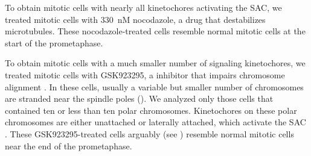To obtain mitotic cells with nearly all kinetochores activating the SAC, we treated mitotic cells with \SI{330}{nM} nocodazole, a drug that destabilizes microtubules. These nocodazole-treated cells resemble normal mitotic cells at the start of the prometaphase.

To obtain mitotic cells with a much smaller number of signaling kinetochores, we treated mitotic cells with GSK923295, a  inhibitor that impairs chromosome alignment \cite{GSK923295}. In these cells, usually a variable but smaller number of chromosomes are stranded near the spindle poles (). We analyzed only those cells that contained ten or less than ten polar chromosomes. Kinetochores on these polar chromosomes are either unattached or laterally attached, which activate the SAC \cite{GSK923295LateralAttachmentEM, GSK923295MonastrolCotreatment}. These GSK923295-treated cells arguably (see ) resemble normal mitotic cells near the end of the prometaphase.

